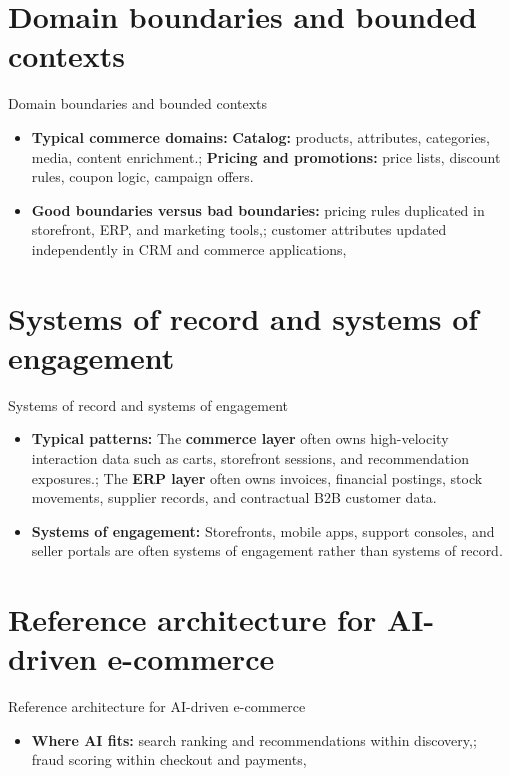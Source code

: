 \documentclass[aspectratio=169]{beamer}
\begin{document}
\section{Domain boundaries and bounded contexts}

\begin{frame}{Domain boundaries and bounded contexts}
  \begin{itemize}
    \item \textbf{Typical commerce domains:} \textbf{Catalog:} products, attributes, categories, media, content enrichment.; \textbf{Pricing and promotions:} price lists, discount rules, coupon logic, campaign offers.
    \item \textbf{Good boundaries versus bad boundaries:} pricing rules duplicated in storefront, ERP, and marketing tools,; customer attributes updated independently in CRM and commerce applications,
  \end{itemize}
\end{frame}

\section{Systems of record and systems of engagement}

\begin{frame}{Systems of record and systems of engagement}
  \begin{itemize}
    \item \textbf{Typical patterns:} The \textbf{commerce layer} often owns high-velocity interaction data such as carts, storefront sessions, and recommendation exposures.; The \textbf{ERP layer} often owns invoices, financial postings, stock movements, supplier records, and contractual B2B customer data.
    \item \textbf{Systems of engagement:} Storefronts, mobile apps, support consoles, and seller portals are often systems of engagement rather than systems of record.
  \end{itemize}
\end{frame}

\section{Reference architecture for AI-driven e-commerce}

\begin{frame}{Reference architecture for AI-driven e-commerce}
  \begin{itemize}
    \item \textbf{Where AI fits:} search ranking and recommendations within discovery,; fraud scoring within checkout and payments,
  \end{itemize}
\end{frame}
\end{document}
